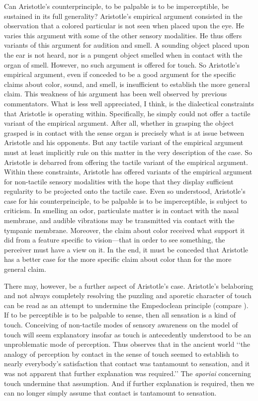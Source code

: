 Can Aristotle's counterprinciple, to be palpable is to be imperceptible, be sustained in its full generality? Aristotle's empirical argument consisted in the observation that a colored particular is not seen when placed upon the eye. He varies this argument with some of the other sensory modalities. He thus offers variants of this argument for audition and smell. A sounding object placed upon the ear is not heard, nor is a pungent object smelled when in contact with the organ of smell. However, no such argument is offered for touch. So Aristotle's empirical argument, even if conceded to be a good argument for the specific claims about color, sound, and smell, is insufficient to establish the more general claim. This weakness of his argument has been well observed by previous commentators. What is less well appreciated, I think, is the dialectical constraints that Aristotle is operating within. Specifically, he simply could not offer a tactile variant of the empirical argument. After all, whether in grasping the object grasped is in contact with the sense organ is precisely what is at issue between Aristotle and his opponents. But any tactile variant of the empirical  argument must at least implicitly rule on this matter in the very description of the case. So Aristotle is debarred from offering the tactile variant of the empirical argument. Within these constraints, Aristotle has offered variants of the empirical argument for non-tactile sensory modalities with the hope that they display sufficient regularity to be projected onto the tactile case. Even so understood, Aristotle's case for his counterprinciple, to be palpable is to be imperceptible, is subject to criticism. In smelling an odor, particulate matter is in contact with the nasal membrane, and audible vibrations may be transmitted via contact with the tympanic membrane. Moreover, the claim about color received what support it did from a feature specific to vision---that in order to see something, the perceiver must have a view on it. In the end, it must be conceded that Aristotle has a better case for the more specific claim about color than for the more general claim.

There may, however, be a further aspect of Aristotle's case. Aristotle's belaboring and not always completely resolving the puzzling and aporetic character of touch can be read as an attempt to undermine the Empedoclean principle (compare \citealt[``When our eyes touch \ldots'']{Derrida:2005aa}). If to be perceptible is to be palpable to sense, then all sensation is a kind of touch. Conceiving of non-tactile modes of sensory awareness on the model of touch will seem explanatory insofar as touch is antecedently understood to be an unproblematic mode of perception. Thus \citet[39]{Lindberg:1977aa} observes that in the ancient world ‘‘the analogy of perception by contact in the sense of touch seemed to establish to nearly everybody’s satisfaction that contact was tantamount to sensation, and it was not apparent that further explanation was required.’’ The \emph{aporiai} concerning touch undermine that assumption. And if further explanation is required, then we can no longer simply assume that contact is tantamount to sensation.

